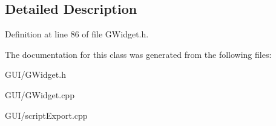 \subsection{Detailed Description}


Definition at line 86 of file G\+Widget.\+h.



The documentation for this class was generated from the following files\+:\begin{DoxyCompactItemize}
\item 
G\+U\+I/G\+Widget.\+h\item 
G\+U\+I/G\+Widget.\+cpp\item 
G\+U\+I/script\+Export.\+cpp\end{DoxyCompactItemize}
